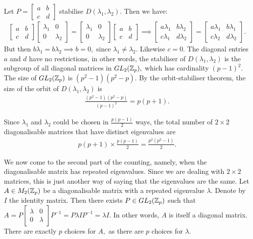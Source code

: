 \documentclass[11pt, titlepage, a4paper]{article}
\begin{document}
Let $P = 
\begin{bmatrix}
 a & b \\
 c & d
\end{bmatrix}
$ stabilise $D(\lambda_{1},\lambda_{2}).$ Then we have:
\begin{align*}
 \begin{bmatrix}
 a & b \\
 c & d
\end{bmatrix}\begin{bmatrix}
 \lambda_{1} & 0 \\
 0 & \lambda_{2}
\end{bmatrix} = \begin{bmatrix}
 \lambda_{1} & 0 \\
 0 & \lambda_{2}
\end{bmatrix}\begin{bmatrix}
 a & b \\
 c & d
\end{bmatrix} \implies  \begin{bmatrix}
 a\lambda_{1} & b\lambda_{2} \\
 c\lambda_{1} & d\lambda_{2}
\end{bmatrix} = \begin{bmatrix}
 a\lambda_{1} & b\lambda_{1} \\
 c\lambda_{2} & d\lambda_{2}
\end{bmatrix}.
\end{align*}
But then $b\lambda_{1}=b\lambda_{2} \implies b = 0,$ since $\lambda_{1}\neq \lambda_{2}.$ Likewise $c = 0.$ The diagonal entries $a$ and $d$ have no restrictions, in other words, the stabiliser of $D(\lambda_{1},\lambda_{2})$ is the subgroup of all diagonal matrices in $GL_{2}(\mathbb{Z}_{p}),$ which has cardinality $(p-1)^{2}.$ The size of $GL_{2}(\mathbb{Z}_{p})$ is $(p^{2}-1)(p^{2}-p).$ By the orbit-stabiliser theorem, the size of the orbit of $D(\lambda_{1},\lambda_{2})$ is
\begin{align*}
 \frac{(p^{2}-1)(p^{2}-p)}{(p-1)^{2}} = p(p+1).
\end{align*}

Since $\lambda_{1}$ and $\lambda_{2}$ could be chosen in $\frac{p(p-1)}{2}$ ways, the total number of $2\times 2$ diagonalisable matrices that have distinct eigenvalues are 
\begin{align*}
 p(p+1) \times \frac{p(p-1)}{2} = \frac{p^{2}(p^{2}-1)}{2}.
\end{align*}

We now come to the second part of the counting, namely, when the diagonalisable matrix has repeated eigenvalues. Since we are dealing with $2\times 2$ matrices, this is just another way of saying that the eigenvalues are the same. Let $A \in M_{2}(\mathbb{Z}_{p})$ be a diagonalisable matrix with a repeated eigenvalue $\lambda.$ Denote by $I$ the identity matrix. Then there exists $P \in GL_{2}(\mathbb{Z}_{p})$ such that $A = P 
\begin{bmatrix}
 \lambda & 0 \\
 0 & \lambda
\end{bmatrix}P^{-1} = P\lambda IP^{-1} = \lambda I.
$ In other words, $A$ is itself a diagonal matrix. There are exactly $p$ choices for $A,$ as there are $p$ choices for $\lambda.$
\end{document}
